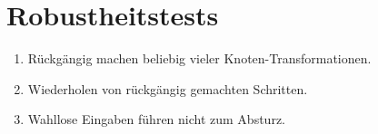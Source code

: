 \section{Robustheitstests}


\begin{enumerate}[resume]
\item Rückgängig machen beliebig vieler Knoten-Transformationen. 
\item Wiederholen von rückgängig gemachten Schritten.
\item Wahllose Eingaben führen nicht zum Absturz.
\end{enumerate}



